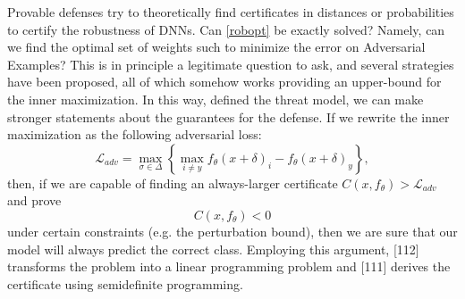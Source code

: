 \documentclass[LaM,binding=0.6cm]{./packages/sapthesis/sapthesis}
\begin{document}
            \label{provrob}
            Provable defenses try to theoretically find certificates in distances or probabilities to certify the robustness of DNNs.
            Can \ref{robopt} be exactly solved? Namely, can we find the optimal set of weights such to minimize 
            the error on Adversarial Examples? This is in principle a legitimate question to ask, and several 
            strategies have been proposed, all of which somehow works providing an upper-bound for the inner maximization.
            In this way, defined the threat model, we can make stronger statements about the guarantees for the defense.
            If we rewrite the inner maximization as the following adversarial loss:
            \begin{equation}
                \mathcal{L}_{a d v}=\max _{\sigma \in \Delta}\left\{\max _{i \neq y} f_{\theta}\left(x + \delta\right)_{i}-f_{\theta}\left(x + \delta\right)_{y}\right\},
            \end{equation}
            then, if we are capable of finding an always-larger certificate $ C(x, f_{\theta}) > \mathcal{L}_{a d v}$ and prove
            \begin{equation}
                C(x, f_{\theta}) < 0
            \end{equation}
            under certain constraints (e.g. the perturbation bound), then we are sure that our model will always predict the correct class. Employing this argument,
            [112] transforms the problem into a linear programming problem and [111] derives the certificate using
            semidefinite programming.
            
\end{document}
